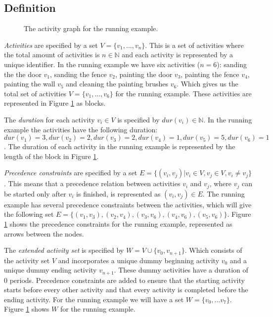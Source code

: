 \documentclass{article}
\theoremstyle{definition}
\newcommand{\dur}[1]{\ensuremath{dur(v_{#1})}} %
\begin{document}
\subsection{Definition}

\begin{figure}[h]
	\centering
	
	\caption{The activity graph for the running example. }
	\label{fig:activity_graph}
\end{figure}

\emph{Activities} are specified by a set $V = \{v_1, \ldots, v_n\}$.
This is a set of activities where the total amount of activities is $n \in \mathbb{N}$ and each activity is represented by a unique identifier. %
In the running example we have six activities ($n = 6$): sanding the the door $v_1$, sanding the fence $v_2$,  painting the door $v_3$, painting the fence $v_4$, painting the wall $v_5$ and cleaning the painting brushes $v_6$.
Which gives us the total set of activities $V = \{v_1, \ldots, v_6\}$ for the running example.
These activities are represented in Figure \ref{fig:activity_graph} as blocks.

The \emph{duration} for each activity $v_i \in V$ is specified by $\dur{i} \in \mathbb{N}$.
In the running example the activities have the following duration: $\dur{1} = 3, \dur{2} = 2, \dur{3} = 2, \dur{4} = 1, \dur{5} = 5, \dur{6} = 1$.
The duration of each activity in the running example is represented by the length of the block in Figure \ref{fig:activity_graph}.

\emph{Precedence constraints} are specified by a set $E = \{(v_i, v_j) | v_i \in V, v_j \in V, v_i \neq v_j\}$.
This means that a precedence relation between activities $v_i$ and $v_j$, where $v_j$ can be started only after $v_i$ is finished, is represented as $(v_i, v_j) \in E$.
The running example has several precedence constraints between the activities, which will give the following set $E = \{(v_1, v_3), (v_2, v_4), (v_3, v_6), (v_4, v_6), (v_5, v_6)\}$.
Figure \ref{fig:activity_graph} shows the precedence constraints for the running example, represented as arrows between the nodes.

The \emph{extended activity set} is specified by $W = V \cup \{v_0, v_{n+1}\}$.
Which consists of the activity set $V$ and incorporates a unique dummy beginning activity $v_0$ and a unique dummy ending activity $v_{n+1}$. 
These dummy activities have a duration of $0$ periods.
Precedence constraints are added to ensure that the starting activity starts before every other activity and that every activity is completed before the ending activity. 
For the running example we will have a set $W = \{v_0, \ldots v_7\}$.
Figure \ref{fig:activity_graph} shows $W$ for the running example. 
\end{document}
